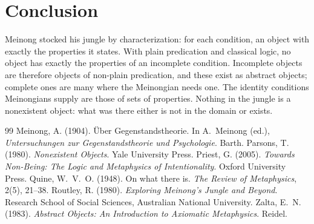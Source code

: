 \documentclass{situationist-preprint}
\begin{document}
\section{Conclusion}

Meinong stocked his jungle by characterization: for each condition, an object with exactly the properties it states. With plain predication and classical logic, no object has exactly the properties of an incomplete condition. Incomplete objects are therefore objects of non-plain predication, and these exist as abstract objects; complete ones are many where the Meinongian needs one. The identity conditions Meinongians supply are those of sets of properties. Nothing in the jungle is a nonexistent object: what was there either is not in the domain or exists.

\begin{thebibliography}{99}\small
{} Meinong, A. (1904). \"Uber Gegenstandstheorie. In A.~Meinong (ed.), \emph{Untersuchungen zur Gegenstandstheorie und Psychologie}. Barth.
 Parsons, T. (1980). \emph{Nonexistent Objects}. Yale University Press.
 Priest, G. (2005). \emph{Towards Non-Being: The Logic and Metaphysics of Intentionality}. Oxford University Press.
 Quine, W.~V.~O. (1948). On what there is. \emph{The Review of Metaphysics}, 2(5), 21--38.
 Routley, R. (1980). \emph{Exploring Meinong's Jungle and Beyond}. Research School of Social Sciences, Australian National University.
 Zalta, E.~N. (1983). \emph{Abstract Objects: An Introduction to Axiomatic Metaphysics}. Reidel.
\end{thebibliography}
\end{document}

